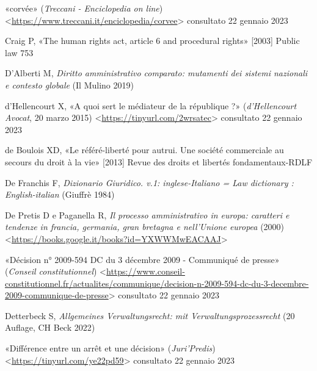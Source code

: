 \documentclass[12pt,it,a4paper,]{report}
\newlength{\cslhangindent}
\newenvironment{CSLReferences}[2] %
 {%
  \setlength{\parindent}{0pt}
  \ifodd #1 \everypar{\setlength{\hangindent}{\cslhangindent}}\ignorespaces\fi
  \ifnum #2 > 0
  \setlength{\parskip}{#2\baselineskip}
  \fi
 }%
 {}
\begin{document}
\begin{CSLReferences}{0}{0}
\leavevmode{}%
{«corvée»} (\emph{Treccani - Enciclopedia on line})
\textless{}\url{https://www.treccani.it/enciclopedia/corvee}\textgreater{}
consultato 22 gennaio 2023

\leavevmode{}%
Craig P, {«The human rights act, article 6 and procedural rights»}
{[}2003{]} Public law 753

\leavevmode{}%
D'Alberti M, \emph{Diritto amministrativo comparato: mutamenti dei
sistemi nazionali e contesto globale} (Il Mulino 2019)

\leavevmode{}%
d'Hellencourt X, {«A quoi sert le médiateur de la république ?»}
(\emph{d'Hellencourt Avocat}, 20 marzo 2015)
\textless{}\url{https://tinyurl.com/2wrsatec}\textgreater{} consultato
22 gennaio 2023

\leavevmode{}%
de Boulois XD, {«Le référé-liberté pour autrui. Une société commerciale
au secours du droit à la vie»} {[}2013{]} Revue des droits et libertés
fondamentaux-RDLF

\leavevmode{}%
De Franchis F, \emph{Dizionario Giuridico. v.1: inglese-Italiano = Law
dictionary : English-italian} (Giuffrè 1984)

\leavevmode{}%
De Pretis D e Paganella R, \emph{Il processo amministrativo in europa:
caratteri e tendenze in francia, germania, gran bretagna e nell'Unione
europea} (2000)
\textless{}\url{https://books.google.it/books?id=YXWWMwEACAAJ}\textgreater{}

\leavevmode{}%
{«Décision n° 2009-594 DC du 3 décembre 2009 - Communiqué de presse»}
(\emph{Conseil constitutionnel})
\textless{}\url{https://www.conseil-constitutionnel.fr/actualites/communique/decision-n-2009-594-dc-du-3-decembre-2009-communique-de-presse}\textgreater{}
consultato 22 gennaio 2023

\leavevmode{}%
Detterbeck S, \emph{Allgemeines Verwaltungsrecht: mit
Verwaltungsprozessrecht} (20 Auflage, CH Beck 2022)

\leavevmode{}%
{«Différence entre un arrêt et une décision»} (\emph{Juri'Predis})
\textless{}\url{https://tinyurl.com/ye22pd59}\textgreater{} consultato
22 gennaio 2023


\end{CSLReferences}
\end{document}

